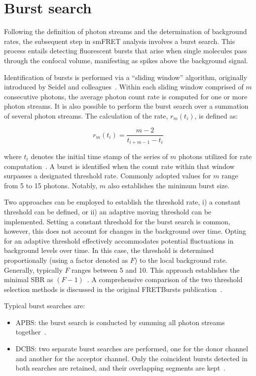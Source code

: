 \section{Burst search}
\label{sec:burst_search_apdx}

Following the definition of photon streams and the determination of background rates, the subsequent step in \ac{smFRET} analysis involves a burst search. 
This process entails detecting fluorescent bursts that arise when single molecules pass through the confocal volume, manifesting as spikes above the background signal.

Identification of bursts is performed via a \enquote{sliding window} algorithm, originally introduced by Seidel and colleagues~\cite{eggeling_PNAS_1998, fries_JPCA_1998}. 
Within each sliding window comprised of $m$ consecutive photons, the average photon count rate is computed for one or more photon streams.
It is also possible to perform the burst search over a summation of several photon streams. 
The calculation of the rate, $r_m(t_i)$, is defined as:

\begin{equation}
\label{eqn:local_rate}
r_m(t_i) = \frac{m-2}{t_{i+m-1}-t_i}
\end{equation}

\noindent
where $t_i$ denotes the initial time stamp of the series of $m$ photons utilized for rate computation~\cite{ingargiola_PLOS1_2016}.
A burst is identified when the count rate within that window surpasses a designated threshold rate.
Commonly adopted values for $m$ range from 5 to 15 photons. 
Notably, $m$ also establishes the minimum burst size.

Two approaches can be employed to establish the threshold rate, i) a constant threshold can be defined, or ii) an adaptive moving threshold can be implemented.
Setting a constant threshold for the burst search is common, however, this does not account for changes in the background over time.
Opting for an adaptive threshold effectively accommodates potential fluctuations in background levels over time. 
In this case, the threshold is determined proportionally (using a factor denoted as $F$) to the local background rate. 
Generally, typically $F$ ranges between 5 and 10. 
This approach establishes the minimal \ac{SBR} as $(F - 1)$~\cite{michalet_PRSB_2012}.
A comprehensive comparison of the two threshold selection methods is discussed in the original FRETBursts publication~\cite{ingargiola_PLOS1_2016}.

Typical burst searches are:
\begin{itemize}
\item \ac{APBS}: the burst search is conducted by summing all photon streams together~\cite{nir_JPCB_2006, eggeling_PNAS_1998, fries_JPCA_1998}.
\item \ac{DCBS}: two separate burst searches are performed, one for the donor channel and another for the acceptor channel. 
Only the coincident bursts detected in both searches are retained, and their overlapping segments are kept~\cite{nir_JPCB_2006}.
\end{itemize}

